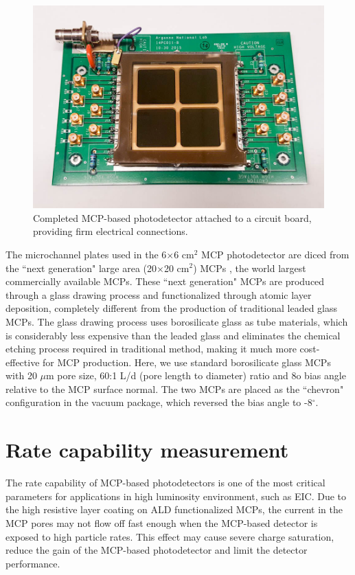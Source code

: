 \documentclass[preprint,5p]{elsarticle}
\begin{document}
\begin{figure}[tbp]
\centering 
\includegraphics[scale=0.23]{fig/MCPs_assembly.png}
\caption{Completed MCP-based photodetector attached to a circuit board, 
providing firm electrical connections.} 
\label{fig:MCP_assm}
\end{figure}

The microchannel plates used in the 6$\times$6 cm$^2$ MCP photodetector are 
diced from the ``next generation" large area (20$\times$20 cm$^2$) MCPs 
\cite{LAPPD,Craven-MCPs}, the world largest commercially available MCPs. These 
``next generation" MCPs are produced through a glass drawing process and 
functionalized through atomic layer deposition, completely different from the 
production of traditional leaded glass MCPs. The glass drawing process uses 
borosilicate glass as tube materials, which is considerably less expensive than 
the leaded glass and eliminates the chemical etching process required in 
traditional method, making it much more cost-effective for MCP production.  
Here, we use standard borosilicate glass MCPs with 20 $\mu$m pore size, 60:1 
L/d (pore length to diameter) ratio and 8o bias angle relative to the MCP 
surface normal. The two MCPs are placed as the ``chevron" configuration in the 
vacuum package, which reversed the bias angle to -8$^{\circ}$. 


\section{Rate capability measurement} \label{sec_proton_measurements}
The rate capability of MCP-based photodetectors is one of the most critical 
parameters for applications in high luminosity environment, such as EIC. Due to 
the high resistive layer coating on ALD functionalized MCPs, the current in the 
MCP pores may not flow off fast enough when the MCP-based detector is exposed 
to high particle rates. This effect may cause severe charge saturation, reduce 
the gain of the MCP-based photodetector and limit the detector performance. 
 
\end{document}
